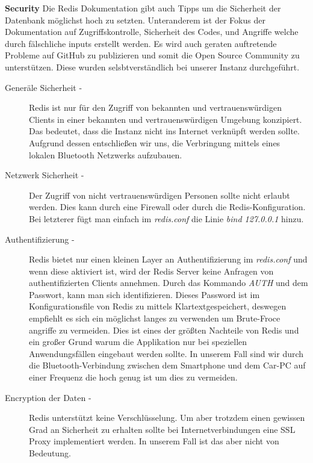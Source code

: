 \textbf{Security\newline}
Die Redis Dokumentation\cite{MELD.CH3-redis.documentation} gibt auch Tipps um die Sicherheit der Datenbank möglichst hoch zu setzten. Unteranderem ist der Fokus der Dokumentation auf Zugriffskontrolle, Sicherheit des Codes, und Angriffe welche durch fälschliche inputs erstellt werden. Es wird auch geraten auftretende Probleme auf GitHub zu publizieren und somit die Open Source Community zu unterstützen. Diese wurden selsbtverständlich bei unserer Instanz durchgeführt.

\begin{description}
\item[Generäle Sicherheit - \newline]
Redis ist nur für den Zugriff von bekannten und vertrauenswürdigen Clients in einer bekannten und vertrauenswürdigen Umgebung konzipiert. Das bedeutet, dass die Instanz nicht ins Internet verknüpft werden sollte. Aufgrund dessen entschließen wir uns, die Verbringung mittels eines lokalen Bluetooth Netzwerks aufzubauen.

\item[Netzwerk Sicherheit - \newline]
Der Zugriff von nicht vertrauenswürdigen Personen sollte nicht erlaubt werden. Dies kann durch eine Firewall oder durch die Redis-Konfiguration. Bei letzterer fügt man einfach im \textit{redis.conf} die Linie \textit{bind 127.0.0.1} hinzu.

\item[Authentifizierung - \newline]
Redis bietet nur einen kleinen Layer an Authentifizierung im \textit{redis.conf} und wenn diese aktiviert ist, wird der Redis Server keine Anfragen von authentifizierten Clients annehmen. Durch das Kommando \textit{AUTH} und dem Passwort, kann man sich identifizieren. Dieses Password ist im Konfigurationsfile von Redis zu mittels Klartextgespeichert, deswegen empfiehlt es sich ein möglichst langes zu verwenden um Brute-Froce angriffe zu vermeiden. Dies ist eines der größten Nachteile von Redis und ein großer Grund warum die Applikation nur bei speziellen Anwendungsfällen eingebaut werden sollte. In unserem Fall sind wir durch die Bluetooth-Verbindung zwischen dem Smartphone und dem Car-PC auf einer Frequenz die hoch genug ist um dies zu vermeiden. 

\item[Encryption der Daten - \newline]
Redis unterstützt keine Verschlüsselung. Um aber trotzdem einen gewissen Grad an Sicherheit zu erhalten sollte bei Internetverbindungen eine SSL Proxy implementiert werden. In unserem Fall ist das aber nicht von Bedeutung.


\end{description}
